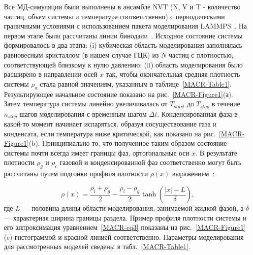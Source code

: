 Все МД-симуляции были выполнены в ансамбле NVT (N, V и T - количество частиц, объем системы и температура соответственно) с периодическими граничными условиями с использованием пакета моделирования LAMMPS~\cite{10.1006/jcph.1995.1039}.
На первом этапе были рассчитаны линии бинодали~\cite{10.1021/jp806127j, 10.1021/jp1117213}.
Исходное состояние системы формировалось в два этапа: (i) кубическая область моделирования заполнялась равновесным кристаллом (в нашем случае ГЦК) из $N$ частиц с плотностью, соответствующей близкому к нулю давлению; (ii) область моделирования было расширено в направлении осей $x$ так, чтобы окончательная средняя плотность системы $\rho_a$ стала равной значениям, указанным в таблице~\ref{MACR-Table1}.
Результирующее начальное состояние показано на рис.~\ref{MACR-Figure1}(а).
Затем температура системы линейно увеличивалась от $T_{start}$ до $T_{stop}$ в течение $n_{step}$ шагов моделирования с временным шагом $\Delta t$.
Конденсированная фаза в какой-то момент начинает испаряться, образуя сосуществование газа и конденсата, если температура ниже критической, как показано на рис.~\ref{MACR-Figure1}(b).
Принципиально то, что полученное таким образом состояние системы почти всегда имеет границы фаз, ортогональные оси $x$.
В результате плотности $\rho_g$ и $\rho_c$ газовой и конденсированной фаз соответственно могут быть рассчитаны путем подгонки профиля плотности $\rho(x)$ выражением~\cite{10.1021/jp806127j, 10.1021/jp1117213}:

\begin{equation}
    \rho(x)=\frac{\rho_{l}+\rho_{g}}{2}-\frac{\rho_{l}-\rho_{g}}{2} \tanh \left(\frac{|x|-L}{\delta}\right),
    \label{MACR-eq3}
\end{equation}
где $L$ — половина длины области моделирования, занимаемой жидкой фазой, а $\delta$ — характерная ширина границы раздела.
Пример профиля плотности системы и его аппроксимация уравнением~\eqref{MACR-eq3} показаны на рис.~\ref{MACR-Figure1}(c) гистограммой и красной линией соответственно.
Параметры моделирования для рассмотренных моделей сведены в табл.~\ref{MACR-Table1}.

